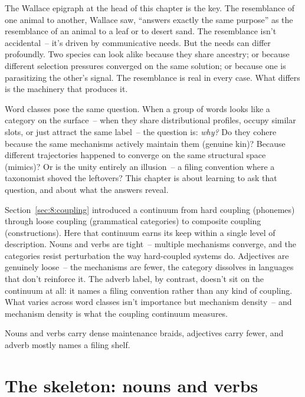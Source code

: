 The Wallace epigraph at the head of this chapter is the key. The resemblance of one animal to another, Wallace saw, \enquote{answers exactly the same purpose} as the resemblance of an animal to a leaf or to desert sand. The resemblance isn't accidental~-- it's driven by communicative needs. But the needs can differ profoundly. Two species can look alike because they share ancestry; or because different selection pressures converged on the same solution; or because one is parasitizing the other's signal. The resemblance is real in every case. What differs is the machinery that produces it.

Word classes pose the same question. When a group of words looks like a category on the surface~-- when they share distributional profiles, occupy similar slots, or just attract the same label~-- the question is: \emph{why?} Do they cohere because the same mechanisms actively maintain them (genuine kin)? Because different trajectories happened to converge on the same structural space (mimics)? Or is the unity entirely an illusion~-- a filing convention where a taxonomist shoved the leftovers? This chapter is about learning to ask that question, and about what the answers reveal.

Section~\ref{sec:8:coupling} introduced a continuum from hard coupling (phonemes) through loose coupling (grammatical categories) to composite coupling (constructions). Here that continuum earns its keep within a single level of description. Nouns and verbs are tight~-- multiple mechanisms converge, and the categories resist perturbation the way hard-coupled systems do. Adjectives are genuinely loose~-- the mechanisms are fewer, the category dissolves in languages that don't reinforce it. The adverb label, by contrast, doesn't sit on the continuum at all: it names a filing convention rather than any kind of coupling. What varies across word classes isn't importance but mechanism density~-- and mechanism density is what the coupling continuum measures.

Nouns and verbs carry dense maintenance braids, adjectives carry fewer, and adverb mostly names a filing shelf.


\section{The skeleton: nouns and verbs}
\label{sec:11:skeleton}

